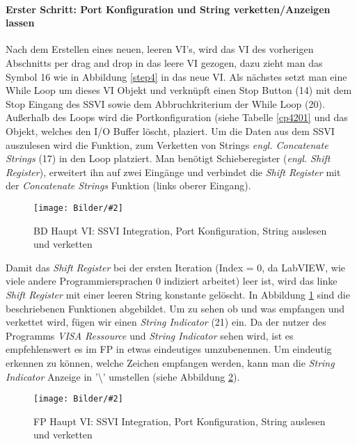 \documentclass[
fontsize=12pt, 
paper=a4, 
BCOR=10mm, 
twoside=false,
 DIV=10, 
 headsepline, 
 footsepline
 ]{scrartcl}
\def\bild#1#2#3#4#5#6{%
\begin{figure}[h!] %
\centering
\texttt{[image: Bilder/\#2]}
\vspace{#3}
\caption[#4]{#5}\label{#6}
\end{figure}
}
\begin{document}



\paragraph{Erster Schritt: Port Konfiguration und String verketten/Anzeigen lassen} Nach dem Erstellen eines neuen, leeren VI's, wird das VI des vorherigen Abschnitts per drag and drop in das leere VI gezogen, dazu zieht man das Symbol 16 wie in Abbildung \ref{step4} in das neue VI. Als nächstes setzt man eine While Loop um dieses VI Objekt und verknüpft einen Stop Button (14) mit dem Stop Eingang des SSVI sowie dem Abbruchkriterium der While Loop (20). Außerhalb des Loops wird die Portkonfiguration (siehe Tabelle \ref{cp4201} und das Objekt, welches den I/O Buffer löscht, plaziert. Um die Daten aus dem SSVI auszulesen wird die Funktion, zum Verketten von Strings \textit{engl. Concatenate Strings} (17) in den Loop platziert. Man benötigt Schieberegister (\textit{engl. Shift Register}), erweitert ihn auf zwei Eingänge und verbindet die \textit{Shift Register} mit der \textit{Concatenate Strings} Funktion (links oberer Eingang). 

\bild{1}
{LabVIEW_serialport/step6.png}
{0em}
{BD Haupt VI: SSVI Integration/Port Konfiguration/Stringoperationen}
{BD Haupt VI: SSVI Integration, Port Konfiguration, String auslesen und \mbox{verketten}}
{step6}

Damit das \textit{Shift Register} bei der ersten Iteration (Index = 0, da LabVIEW, wie viele andere Programmiersprachen 0 indiziert arbeitet) leer ist, wird das linke \textit{Shift Register} mit einer leeren String konstante gelöscht. In Abbildung \ref{step6} sind die beschriebenen Funktionen abgebildet. Um zu sehen ob und was empfangen und verkettet wird, fügen wir einen \textit{String Indicator} (21) ein. Da der nutzer des Programms \textit{VISA Ressource} und \textit{String Indicator} sehen wird, ist es empfehlenswert es im FP in etwas eindeutiges umzubenennen. Um eindeutig erkennen zu können, welche Zeichen empfangen werden, kann man die \textit{String Indicator} Anzeige in '\textbackslash' umstellen (siehe Abbildung \ref{step6b}).

\bild{0.4}
{LabVIEW_serialport/step6b.png}
{0em}
{FP Haupt VI: SSVI Integration/Port Konfiguration/Stringoperationen}
{FP Haupt VI: SSVI Integration, Port Konfiguration, String auslesen und \mbox{verketten}}
{step6b}
\end{document}
